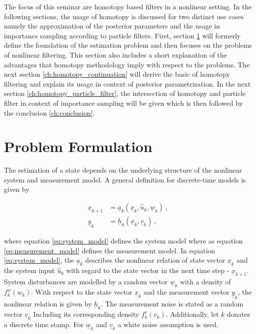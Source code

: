 \documentclass[a4paper]{IEEEtran}
\begin{document}
The focus of this seminar are homotopy based filters in a nonlinear setting. In the following sections, the usage of homotopy is discussed for two distinct use cases namely the approximation of the posterior parameters and the usage in importance sampling according to particle filters. First, section \ref{ch:problem_formulation} will formerly define the foundation of the estimation problem and then focuses on the problems 
of nonlinear filtering. This section also includes a short explanation of the advantages that homotopy methodology imply with respect to the problems. The next section \ref{ch:homotopy_continuation} will derive the basic of homotopy filtering and explain its usage in context of posterior parametrization. In the next section \ref{ch:homotopy_particle_filter}, the intersection of homotopy and particle filter in context of importance sampling will be given which is then followed by the conclusion \ref{ch:conclusion}.

\section{Problem Formulation}
\label{ch:problem_formulation}

The estimation of a state depends on the underlying structure of the nonlinear system and measurement model. A general definition for discrete-time models is given by

\begin{align}
    \underline{x}_{k+1}  &= \underline{a}_{k}(\underline{x}_{k}, \hat{u}_{k},  \underline{w}_{k}) \,,  \label{eq:system_model} \\
    \underline{y}_{k}    &= \underline{h}_{k}(\underline{x}_{k}, \underline{v}_{k}) \,, \label{eq:measurement_model}
\end{align}

where equation \eqref{eq:system_model} defines the system model where as equation \eqref{eq:measurement_model} defines the measurement model. In equation \eqref{eq:system_model}, 
the $\underline{a}_{k}$ describes the nonlinear relation of state vector $\underline{x}_{k}$ and the system input $\hat{u}_{k}$ with regard to the state vector in the next time step - $\underline{x}_{k+1}$.
System disturbances are modelled by a random vector $\underline{w}_{k}$ with a density of $f^{w}_{k}(w_{k})$. With respect to the state vector $\underline{x}_{k}$ and the measurement vector $\underline{y}_{k}$,
the nonlinear relation is given by $\underline{h}_{k}$. The measurement noise is stated as a random vector $\underline{v}_{k}$ Including its corresponding density $f^{v}_{k}(v_{k})$. Additionally, let $k$ donates a discrete time stamp.
For $\underline{w}_{k}$ and $\underline{v}_{k}$ a white noise assumption is used.
\end{document}
